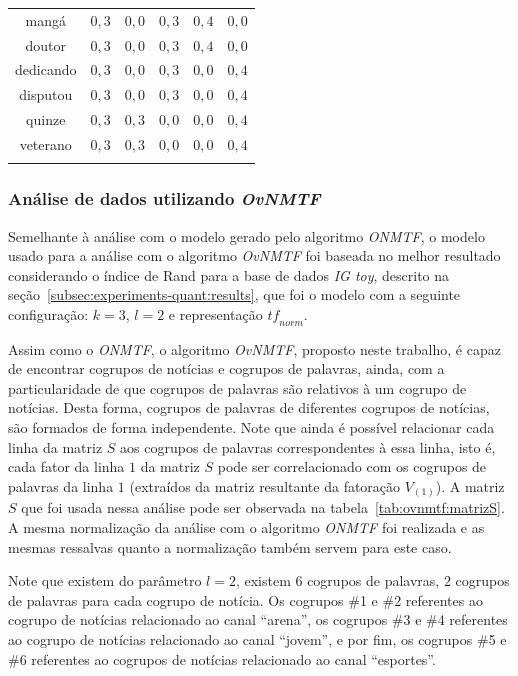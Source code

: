 \documentclass[
    12pt,                %
    oneside,            %
    a4paper,            %
    english,            %
    brazil                %
    ]{abntex2ppgsi}
\begin{document}
\begin{table}[H]
{\begin{tabular}{cccccc}
            mangá          & $0,3$ & $0,0$ & $0,3$ & $0,4$ & $0,0$ \\
            doutor         & $0,3$ & $0,0$ & $0,3$ & $0,4$ & $0,0$ \\
            dedicando      & $0,3$ & $0,0$ & $0,3$ & $0,0$ & $0,4$ \\
            disputou       & $0,3$ & $0,0$ & $0,3$ & $0,0$ & $0,4$ \\
            quinze         & $0,3$ & $0,3$ & $0,0$ & $0,0$ & $0,4$ \\
            veterano       & $0,3$ & $0,3$ & $0,0$ & $0,0$ & $0,4$ \\
            \hline \\
        \end{tabular}
    }
    \label{tab:experiments-quali-peak-words:onmtf}
\end{table}

\subsubsection{Análise de dados utilizando \textit{OvNMTF}}

Semelhante à análise com o modelo gerado pelo algoritmo \textit{ONMTF}, o modelo usado para a análise com o algoritmo \textit{OvNMTF} foi baseada no melhor resultado considerando o índice de Rand para a base de dados \textit{IG toy}, descrito na seção~\ref{subsec:experiments-quant:results}, que foi o modelo com a seguinte configuração: $k = 3$, $l = 2$ e representação $\textit{tf}_{norm}$.

Assim como o \textit{ONMTF}, o algoritmo \textit{OvNMTF}, proposto neste trabalho, é capaz de encontrar cogrupos de notícias e cogrupos de palavras, ainda, com a particularidade de que cogrupos de palavras são relativos à um cogrupo de notícias.
Desta forma, cogrupos de palavras de diferentes cogrupos de notícias, são formados de forma independente.
Note que ainda é possível relacionar cada linha da matriz $S$ aos cogrupos de palavras correspondentes à essa linha, isto é, cada fator da linha $1$ da matriz $S$ pode ser correlacionado com os cogrupos de palavras da linha $1$ (extraídos da matriz resultante da fatoração $V_{(1)}$).
A matriz $S$ que foi usada nessa análise pode ser observada na tabela~\ref{tab:ovnmtf:matrizS}.
A mesma normalização da análise com o algoritmo \textit{ONMTF} foi realizada e as mesmas ressalvas quanto a normalização também servem para este caso.

Note que existem do parâmetro $l = 2$, existem $6$ cogrupos de palavras, $2$ cogrupos de palavras para cada cogrupo de notícia.
Os cogrupos \#1 e \#2 referentes ao cogrupo de notícias relacionado ao canal ``arena'', os cogrupos \#3 e \#4 referentes ao cogrupo de notícias relacionado ao canal ``jovem'', e por fim, os cogrupos \#5 e \#6 referentes ao cogrupos de notícias relacionado ao canal ``esportes''.
\end{document}
